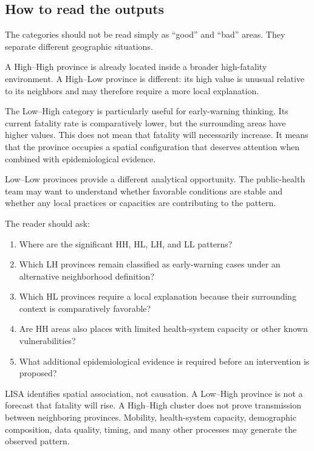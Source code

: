 \documentclass[11pt]{article}
\begin{document}
\subsection{How to read the outputs}

The categories should not be read simply as ``good'' and ``bad'' areas. They separate different geographic situations.

A High--High province is already located inside a broader high-fatality environment. A High--Low province is different: its high value is unusual relative to its neighbors and may therefore require a more local explanation.

The Low--High category is particularly useful for early-warning thinking. Its current fatality rate is comparatively lower, but the surrounding areas have higher values. This does not mean that fatality will necessarily increase. It means that the province occupies a spatial configuration that deserves attention when combined with epidemiological evidence.

Low--Low provinces provide a different analytical opportunity. The public-health team may want to understand whether favorable conditions are stable and whether any local practices or capacities are contributing to the pattern.

The reader should ask:

\begin{enumerate}[leftmargin=*]
    \item Where are the significant HH, HL, LH, and LL patterns?
    \item Which LH provinces remain classified as early-warning cases under an alternative neighborhood definition?
    \item Which HL provinces require a local explanation because their surrounding context is comparatively favorable?
    \item Are HH areas also places with limited health-system capacity or other known vulnerabilities?
    \item What additional epidemiological evidence is required before an intervention is proposed?
\end{enumerate}

\begin{validationbox}
LISA identifies spatial association, not causation. A Low--High province is not a forecast that fatality will rise. A High--High cluster does not prove transmission between neighboring provinces. Mobility, health-system capacity, demographic composition, data quality, timing, and many other processes may generate the observed pattern.
\end{validationbox}
\end{document}
